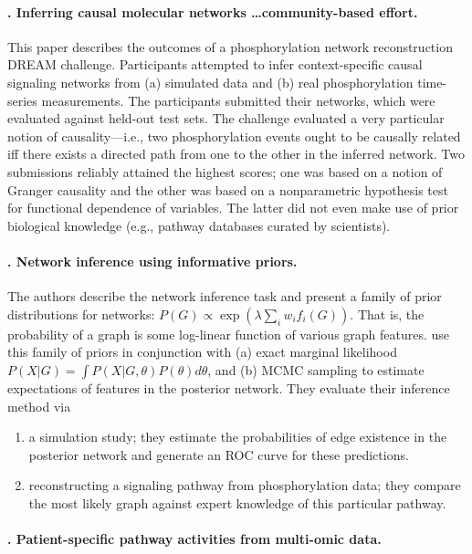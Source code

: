 \documentclass[14pt]{article}
\begin{document}
\paragraph{ \citet{2016-hill-community}. Inferring causal molecular networks \ldots community-based effort.}
This paper describes the outcomes of a phosphorylation network reconstruction DREAM challenge.
Participants attempted to infer context-specific causal signaling networks from (a) simulated data and (b) real phosphorylation time-series measurements.
The participants submitted their networks, which were evaluated against held-out test sets.
The challenge evaluated a very particular notion of causality---i.e., two phosphorylation events ought to be causally related iff there exists a directed path from one to the other in the inferred network.
Two submissions reliably attained the highest scores; one was based on a notion of Granger causality and the other was based on a nonparametric hypothesis test for functional dependence of variables.
The latter did not even make use of prior biological knowledge (e.g., pathway databases curated by scientists).

\paragraph{ \citet{2008-mukherjee-priors}. Network inference using informative priors.}
The authors describe the network inference task and present a family of prior distributions for networks:
$ P(G) \propto \exp\left( \lambda \sum_i w_i f_i(G) \right).$ 
That is, the probability of a graph is some log-linear function of various graph features. 
\citeauthor{2008-mukherjee-priors} use this family of priors in conjunction with 
(a) exact marginal likelihood $P(X | G) = \int P(X | G, \theta) P(\theta) d\theta$, and
(b) MCMC sampling
to estimate expectations of features in the posterior network.
They evaluate their inference method via 
\begin{enumerate}
    \item a simulation study; they estimate the probabilities of edge existence in the posterior network
        and generate an ROC curve for these predictions.
    \item reconstructing a signaling pathway from phosphorylation data; they compare the most likely
        graph against expert knowledge of this particular pathway.
\end{enumerate}

\paragraph{ \citet{2010-vaske-paradigm}. Patient-specific pathway activities from multi-omic data.}




\pagebreak
\end{document}
